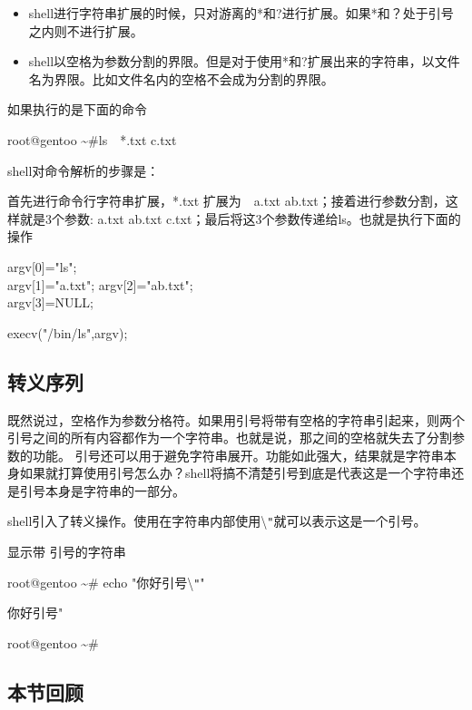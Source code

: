 \begin{itemize}
\item shell进行字符串扩展的时候，只对游离的*和?进行扩展。如果*和？处于引号之内则不进行扩展。
\item shell以空格为参数分割的界限。但是对于使用*和?扩展出来的字符串，以文件名为界限。比如文件名内的空格不会成为分割的界限。
\end{itemize}


如果执行的是下面的命令
\begin{code}
root@gentoo \textasciitilde \#ls　*.txt c.txt
\end{code}

shell对命令解析的步骤是：

首先进行命令行字符串扩展，*.txt 扩展为　a.txt ab.txt；接着进行参数分割，这样就是3个参数: a.txt ab.txt c.txt；最后将这3个参数传递给ls。也就是执行下面的操作

\begin{code}
argv[0]="ls";\\
argv[1]="a.txt";
argv[2]="ab.txt";\\
argv[3]=NULL;

execv("/bin/ls",argv);
\end{code}

\subsection*{转义序列}

既然说过，空格作为参数分格符。如果用引号将带有空格的字符串引起来，则两个引号之间的所有内容都作为一个字符串。也就是说，那之间的空格就失去了分割参数的功能。
引号还可以用于避免字符串展开。功能如此强大，结果就是字符串本身如果就打算使用引号怎么办？shell将搞不清楚引号到底是代表这是一个字符串还是引号本身是字符串的一部分。

shell引入了转义操作。使用在字符串内部使用{\textbackslash\tt{}"}就可以表示这是一个引号。

\begin{example}{显示带 引号的字符串}
\begin{code}
root@gentoo \textasciitilde \# echo "你好引号{\textbackslash\tt{}"}"

你好引号"

root@gentoo \textasciitilde \#
\end{code}
\end{example}

\subsection*{本节回顾}

